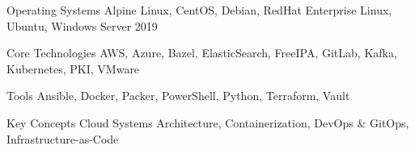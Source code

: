\begin{cvskills}


\cvskill
{Operating Systems} %
{ %
 Alpine Linux,
 CentOS,
 Debian,
 RedHat Enterprise Linux,
 Ubuntu,
 Windows Server 2019
}


\cvskill
{Core Technologies} %
{ %
 AWS,
 Azure,
 Bazel,
 ElasticSearch,
 FreeIPA,
 GitLab,
 Kafka,
 Kubernetes,
 PKI,
 VMware
}


\cvskill
{Tools} %
{ %
 Ansible,
 Docker,
 Packer,
 PowerShell,
 Python,
 Terraform,
 Vault
}


\cvskill
{Key Concepts} %
{ %
 Cloud Systems Architecture,
 Containerization,
 DevOps \& GitOps,
 Infrastructure-as-Code
}


\end{cvskills}
